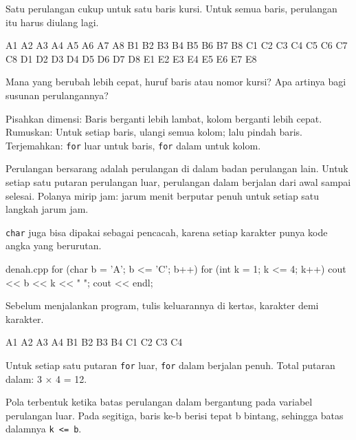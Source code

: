 \documentclass[a4paper]{article}
\begin{document}
Satu perulangan cukup untuk satu baris kursi. Untuk semua baris, perulangan itu harus diulang lagi.

\begin{MKeluaran}[title={Tampilan yang diinginkan}]
A1 A2 A3 A4 A5 A6 A7 A8
B1 B2 B3 B4 B5 B6 B7 B8
C1 C2 C3 C4 C5 C6 C7 C8
D1 D2 D3 D4 D5 D6 D7 D8
E1 E2 E3 E4 E5 E6 E7 E8
\end{MKeluaran}
\begin{Tebak}
Mana yang berubah lebih cepat, huruf baris atau nomor kursi? Apa artinya bagi susunan perulangannya?
\end{Tebak}
\begin{Jawaban}
Pisahkan dimensi: Baris berganti lebih lambat, kolom berganti lebih cepat. Rumuskan: Untuk setiap baris, ulangi semua kolom; lalu pindah baris. Terjemahkan: \texttt{for} luar untuk baris, \texttt{for} dalam untuk kolom.
\end{Jawaban}
Perulangan bersarang adalah perulangan di dalam badan perulangan lain. Untuk setiap satu putaran perulangan luar, perulangan dalam berjalan dari awal sampai selesai. Polanya mirip jam: jarum menit berputar penuh untuk setiap satu langkah jarum jam.

\texttt{char} juga bisa dipakai sebagai pencacah, karena setiap karakter punya kode angka yang berurutan.

\begin{MKode}{denah.cpp}
for (char b = 'A'; b <= 'C'; b++) {
    for (int k = 1; k <= 4; k++) {
        cout << b << k << " ";
    }
    cout << endl;
}
\end{MKode}
\begin{Tebak}[]
Sebelum menjalankan program, tulis keluarannya di kertas, karakter demi karakter.
\end{Tebak}
\begin{Jawaban}[]
\begin{MKeluaran}[]
A1 A2 A3 A4 
B1 B2 B3 B4 
C1 C2 C3 C4 
\end{MKeluaran}
Untuk setiap satu putaran \texttt{for} luar, \texttt{for} dalam berjalan penuh. Total putaran dalam: 3 × 4 = 12.
\end{Jawaban}
Pola terbentuk ketika batas perulangan dalam bergantung pada variabel perulangan luar. Pada segitiga, baris ke-b berisi tepat b bintang, sehingga batas dalamnya \texttt{k <= b}.
\end{document}
